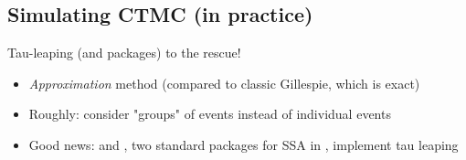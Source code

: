 \documentclass[aspectratio=169]{beamer}\usepackage[]{graphicx}\usepackage[]{xcolor}
\begin{document}

\subsection{Simulating CTMC (in practice)}

\begin{frame}{Tau-leaping (and packages) to the rescue!}
    \begin{itemize}
        \item \emph{Approximation} method (compared to classic Gillespie, which is exact)
        \item Roughly: consider "groups" of events instead of individual events
        \item Good news:  and , two standard packages for SSA in , implement tau leaping
    \end{itemize}
\end{frame}
\end{document}
